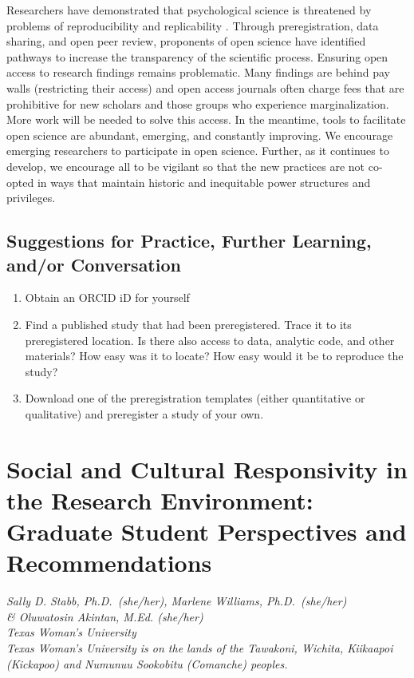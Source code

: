 \documentclass[
  11pt,
]{book}
\providecommand{\tightlist}{%
  \setlength{\itemsep}{0pt}\setlength{\parskip}{0pt}}
\begin{document}
Researchers have demonstrated that psychological science is threatened by problems of reproducibility and replicability \citep{open_science_collaboration_estimating_2015}. Through preregistration, data sharing, and open peer review, proponents of open science have identified pathways to increase the transparency of the scientific process. Ensuring open access to research findings remains problematic. Many findings are behind pay walls (restricting their access) and open access journals often charge fees that are prohibitive for new scholars and those groups who experience marginalization. More work will be needed to solve this access. In the meantime, tools to facilitate open science are abundant, emerging, and constantly improving. We encourage emerging researchers to participate in open science. Further, as it continues to develop, we encourage all to be vigilant so that the new practices are not co-opted in ways that maintain historic and inequitable power structures and privileges.

\section{Suggestions for Practice, Further Learning, and/or Conversation}\label{suggestions-for-practice-further-learning-andor-conversation-2}

\begin{enumerate}
\def\labelenumi{\arabic{enumi}.}
\tightlist
\item
  Obtain an ORCID iD for yourself
\item
  Find a published study that had been preregistered. Trace it to its preregistered location. Is there also access to data, analytic code, and other materials? How easy was it to locate? How easy would it be to reproduce the study?
\item
  Download one of the preregistration templates (either quantitative or qualitative) and preregister a study of your own.
\end{enumerate}

\chapter{Social and Cultural Responsivity in the Research Environment: Graduate Student Perspectives and Recommendations}\label{Environ}

\emph{Sally D. Stabb, Ph.D.~(she/her), Marlene Williams, Ph.D.~(she/her)}\\
\emph{\& Oluwatosin Akintan, M.Ed. (she/her)}\\
\emph{Texas Woman's University}\\
\emph{Texas Woman's University is on the lands of the Tawakoni, Wichita, Kiikaapoi (Kickapoo) and Numunuu Sookobitu (Comanche) peoples.}\\
\end{document}
